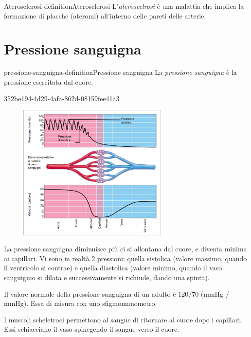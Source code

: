 \documentclass[preview]{standalone}
\begin{document}
\begin{snippetdefinition}{Aterosclerosi-definition}{Aterosclerosi}
    L'\textit{ateroscelrosi} è una malattia che implica la formazione di placche (ateromi) all'interno delle pareti delle arterie.
\end{snippetdefinition}


\section{Pressione sanguigna}

\begin{snippetdefinition}{pressione-sanguigna-definition}{Pressione sanguigna}
    La \textit{pressione sanguigna} è la pressione esercitata dal cuore.
\end{snippetdefinition}

\begin{snippet}{352be194-4d29-4afa-862d-08159fee41a3}
    \setlength{\intextsep}{0pt}%
    \begin{figure}
        \includegraphics[width=7.5cm]{./resources/pressione.png}
        \vspace{-1cm}
    \end{figure}
    
    La pressione sanguigna diminuisce più ci si allontana dal cuore, e diventa minima ai capillari.
    Vi sono in realtà 2 pressioni:
    quella sistolica (valore massimo, quando il ventricolo si contrae) e quella diastolica
    (valore minimo, quando il vaso sanguignio si dilata e successivamente si richiude, dando una spinta).
    
    Il valore normale della pressione sanguigna di un adulto è 120/70 (mmHg / mmHg).
    Essa di misura con uno sfigmomanometro.
    
    I muscoli scheletroci permettono al sangue di ritornare al cuore dopo i capillari.
    Essi schiacciano il vaso spinegendo il sangue verso il cuore.
    \wrapfill
\end{snippet}
\end{document}
